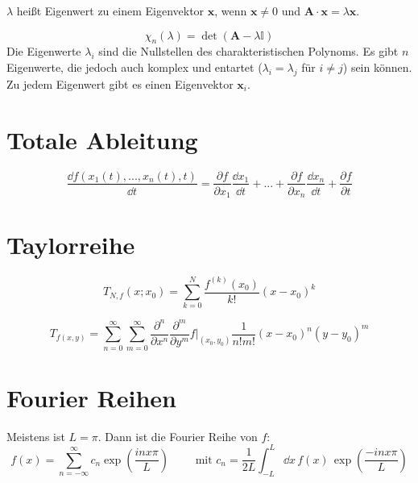 \begin{frameddefn}
	$\lambda$ heißt Eigenwert zu einem Eigenvektor $\mathbf{x}$, wenn $\mathbf{x} \neq 0$ und $\mathbf{A} \cdot \mathbf{x} = \lambda \mathbf{x}$.
\end{frameddefn}

\begin{framedprop}
	\[\chi_n(\lambda) = \det(\mathbf{A}-\lambda \mathbb{I}) \]
	Die Eigenwerte $\lambda_i$ sind die Nullstellen des charakteristischen Polynoms. Es gibt $n$ Eigenwerte, die jedoch auch komplex und entartet ($\lambda_i = \lambda_j$ für $i\neq j$) sein können. Zu jedem Eigenwert gibt es einen Eigenvektor $\mathbf{x}_i$.
\end{framedprop}

\section{Totale Ableitung}

\begin{framedprop}
\[
\frac{\dd f(x_1(t), ..., x_n(t), t)}{\dd t} = \frac{\partial f}{\partial x_1} \frac{\dd x_1}{\dd t} + ... + \frac{\partial f}{\partial x_n} \frac{\dd x_n}{\dd t} + \frac{\partial f}{\partial t}
\]
\end{framedprop}

\newpage
\section{Taylorreihe}

\begin{framedprop}[Taylorreihe]
	\[
	T_{N, f}(x; x_0) = \sum_{k=0}^{N} \frac{f^{(k)}(x_0)}{k!} (x-x_0)^k
	\]
\end{framedprop}

\begin{framedprop}
	\[
	T_{f(x,y)} = \sum_{n=0}^{\infty} \sum_{m=0}^{\infty} \frac{\partial^n}{\partial x^n} \frac{\partial^m}{\partial y^m} f \bigg|_{(x_0,y_0)} \frac{1}{n!m!} (x-x_0)^n (y-y_0)^m
	\]
\end{framedprop}


\section{Fourier Reihen}

\begin{framedprop}
	Meistens ist $L = \pi$. Dann ist die Fourier Reihe von $f$:
	\[
	f(x) = \sum_{n=-\infty}^{\infty} c_n \exp\left(\frac{inx \pi}{L}\right) \qquad \textrm{ mit }
	c_n = \frac{1}{2L} \int_{-L}^{L} \dd x \, f(x) \, \exp\left(\frac{-inx \pi}{L}\right)
	\]
\end{framedprop}

